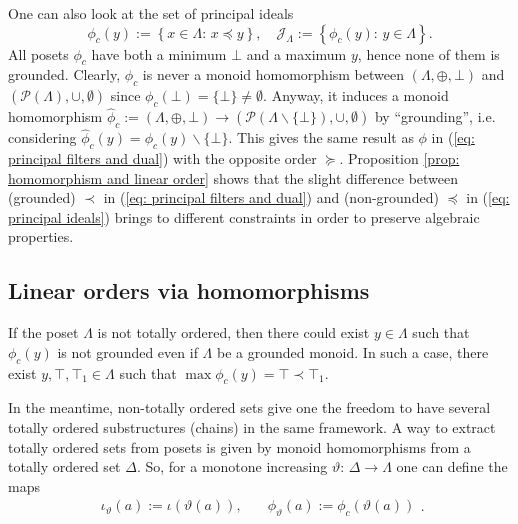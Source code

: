 \documentclass[11pt,british,reqno]{article}
\numberwithin{equation}{section}
\numberwithin{figure}{section}
\numberwithin{table}{section}
\theoremstyle{definition}
\theoremstyle{definition}
\theoremstyle{plain}
\theoremstyle{plain}
\theoremstyle{remark}
\theoremstyle{plain}
\numberwithin{equation}{section}
\numberwithin{figure}{section}
\numberwithin{table}{section}
\theoremstyle{plain}
\begin{document}
One can also look at the set of principal ideals 
\begin{equation}
\phi_{c}(y):=\left\{ x\in\Lambda:\,x\preceq y\right\} ,\quad\mathcal{J}_{\Lambda}:=\left\{\phi_{c}(y):\,y\in\Lambda\right\} .\label{eq: principal ideals}
\end{equation}
All posets $\phi_{c}$ have both a minimum $\bot$ and a maximum
$y$, hence none of them is grounded. Clearly, $\phi_{c}$ is never
a monoid homomorphism between $(\Lambda,\oplus,\bot)$ and $(\mathcal{P}(\Lambda),\cup,\emptyset)$
since $\phi_{c}(\bot)=\{\bot\}\neq\emptyset$. Anyway, it induces
a monoid homomorphism $\hat{\phi}_c:=(\Lambda,\oplus,\bot)\longrightarrow\left(\mathcal{P}(\Lambda\backslash\{\bot\}),\cup,\emptyset\right)$
by ``grounding'', i.e. considering $\hat{\phi}_c(y)=\phi_{c}(y)\backslash\{\bot\}$.
This gives the same result as $\phi$ in (\ref{eq: principal filters and dual})
with the opposite order $\succeq$. Proposition \ref{prop: homomorphism and linear order} shows that the slight difference between (grounded) $\prec$ in (\ref{eq: principal filters and dual}) and
(non-grounded) $\preceq$ in (\ref{eq: principal ideals}) brings
to different constraints in order to preserve algebraic properties.

\subsection{\label{subsec: Linear orders via homomorphisms} Linear orders via homomorphisms}

If the poset $\Lambda$ is not totally ordered, then
there could exist $y\in\Lambda$ such that $\phi_{c}(y)$ is not
grounded even if $\Lambda$ be a grounded monoid. In such a case,
there exist $y,\top,\top_{1}\in\Lambda$ such that $\max\phi_{c}(y)=\top\prec\top_{1}$.

In the meantime, non-totally ordered sets give one the freedom to
have several totally ordered substructures (chains) in the same framework.
A way to extract totally ordered sets from posets is given by monoid
homomorphisms from a totally ordered set $\Delta$. So, for a monotone
increasing $\vartheta:\,\Delta\longrightarrow\Lambda$ one can define
the maps 
\begin{equation}
\begin{array}{cc}
\iota_{\vartheta}(a):=\iota(\vartheta(a)), & \quad\phi_{\vartheta}(a):=\phi_c(\vartheta(a))\end{array}.\label{eq: ideals for filter presentation}
\end{equation}
\end{document}
